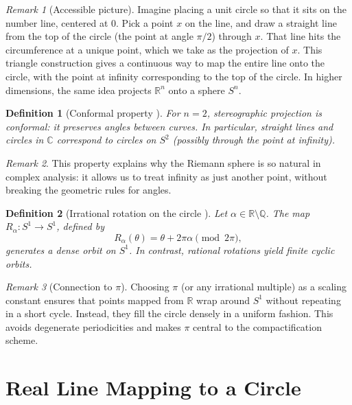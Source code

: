 \documentclass[12pt]{article}
\newtheorem{definition}{Definition}
\theoremstyle{remark}
\newtheorem*{remark}{Remark}
\begin{document}
\begin{remark}[Accessible picture]
Imagine placing a unit circle so that it sits on the number line, centered at 0. 
Pick a point $x$ on the line, and draw a straight line from the top of the circle 
(the point at angle $\pi/2$) through $x$. That line hits the circumference at 
a unique point, which we take as the projection of $x$. This triangle construction 
gives a continuous way to map the entire line onto the circle, with the 
point at infinity corresponding to the top of the circle. In higher dimensions, 
the same idea projects $\mathbb{R}^n$ onto a sphere $S^n$.
\end{remark}

\begin{definition}[Conformal property {\citep{AhlforsComplex}}]
For $n=2$, stereographic projection is conformal: it preserves angles between 
curves. In particular, straight lines and circles in $\mathbb{C}$ correspond to 
circles on $S^2$ (possibly through the point at infinity).
\end{definition}

\begin{remark}
This property explains why the Riemann sphere is so natural in complex analysis: 
it allows us to treat infinity as just another point, without breaking the 
geometric rules for angles.
\end{remark}

\begin{definition}[Irrational rotation on the circle {\citep{Weyl1916,WaltersErgodic}}]
Let $\alpha \in \mathbb{R} \setminus \mathbb{Q}$. The map 
$R_\alpha : S^1 \to S^1$, defined by 
\[
R_\alpha(\theta) = \theta + 2\pi \alpha \pmod{2\pi},
\]
generates a dense orbit on $S^1$. In contrast, rational rotations yield finite 
cyclic orbits.
\end{definition}

\begin{remark}[Connection to $\pi$]
Choosing $\pi$ (or any irrational multiple) as a scaling constant ensures that 
points mapped from $\mathbb{R}$ wrap around $S^1$ without repeating in a short 
cycle. Instead, they fill the circle densely in a uniform fashion. This avoids 
degenerate periodicities and makes $\pi$ central to the compactification scheme.
\end{remark}

\section{Real Line Mapping to a Circle}
\label{sec:circle}
\end{document}
